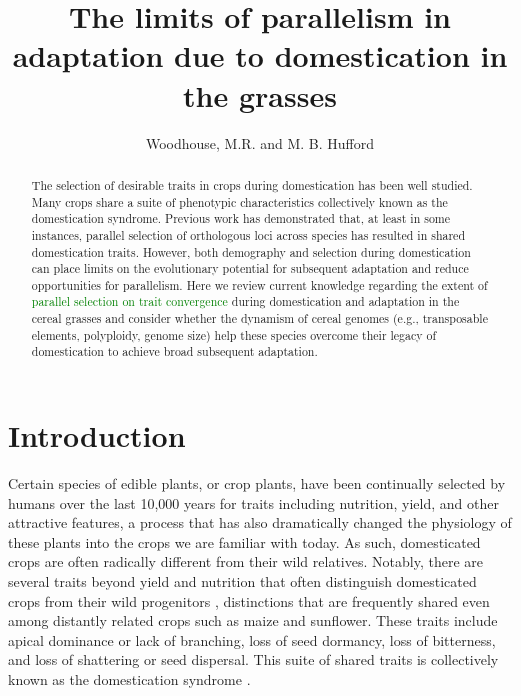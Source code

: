 \documentclass[12pt]{article}
\title{The limits of parallelism in adaptation due to domestication in the grasses}
\author{Woodhouse, M.R. and M. B. Hufford}
\newcommand{\mw}[1]{\textcolor{green}{\normalsize #1}}
\begin{document}
\maketitle

\begin{abstract}
The selection of desirable traits in crops during domestication has been well studied.
Many crops share a suite of phenotypic characteristics collectively known as the domestication syndrome.
Previous work has demonstrated that, at least in some instances, parallel selection of orthologous loci across species has resulted in shared domestication traits.
However, both demography and selection during domestication can place limits on the evolutionary potential for subsequent adaptation and reduce opportunities for parallelism.
Here we review current knowledge regarding the extent of \mw{parallel selection on trait convergence} during domestication and adaptation in the cereal grasses and consider whether the dynamism of cereal genomes (e.g., transposable elements, polyploidy, genome size) help these species overcome their legacy of domestication to achieve broad subsequent adaptation.
\end{abstract}

\section*{Introduction}
Certain species of edible plants, or crop plants, have been continually selected by humans over the last 10,000 years for traits including nutrition, yield, and other attractive features, a process that has also dramatically changed the physiology of these plants into the crops we are familiar with today.
As such, domesticated crops are often radically different from their wild relatives.
Notably, there are several traits beyond yield and nutrition that often distinguish domesticated crops from their wild progenitors \citep{Doebley2006}, distinctions that are frequently shared even among distantly related crops such as maize and sunflower.
These traits include apical dominance or lack of branching, loss of seed dormancy, loss of bitterness, and loss of shattering or seed dispersal.
This suite of shared traits is collectively known as the domestication syndrome \citep{Hammer1984}.
\end{document}
